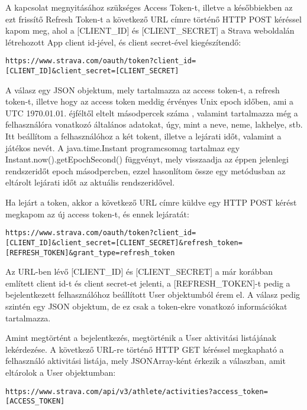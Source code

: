 A kapcsolat megnyitásához szükséges Access Token-t, illetve a későbbiekben az ezt frissítő Refresh Token-t a következő URL címre történő HTTP POST kéréssel kapom meg, ahol a [CLIENT\_ID] és [CLIENT\_SECRET] a Strava weboldalán létrehozott App client id-jével, és client secret-ével kiegészítendő:

\begin{verbatim}
https://www.strava.com/oauth/token?client_id=[CLIENT_ID]&client_secret=[CLIENT_SECRET] 
\end{verbatim}

A válasz egy JSON objektum, mely tartalmazza az access token-t, a refresh token-t, illetve hogy az access token meddig érvényes Unix epoch időben, ami a UTC 1970.01.01. éjféltől eltelt másodpercek száma , valamint tartalmazza még a felhasználóra vonatkozó általános adatokat, úgy, mint a neve, neme, lakhelye, stb. Itt beállítom a felhasználóhoz a két tokent, illetve a lejárati időt, valamint a játékos nevét. A java.time.Instant programcsomag tartalmaz egy Instant.now().getEpochSecond() függvényt, mely visszaadja az éppen jelenlegi rendszeridőt epoch másodpercben, ezzel hasonlítom össze egy metódusban az eltárolt lejárati időt az aktuális rendszeridővel. 

Ha lejárt a token, akkor a következő URL címre küldve egy HTTP POST kérést megkapom az új access token-t, és ennek lejáratát:

\begin{verbatim}
https://www.strava.com/oauth/token?client_id=[CLIENT_ID]&client_secret=[CLIENT_SECRET]&refresh_token=[REFRESH_TOKEN]&grant_type=refresh_token 
\end{verbatim}

Az URL-ben lévő [CLIENT\_ID] és [CLIENT\_SECRET] a már korábban említett client id-t és client secret-et jelenti, a [REFRESH\_TOKEN]-t pedig a bejelentkezett felhasználóhoz beállított User objektumból érem el. A válasz pedig szintén egy JSON objektum, de ez csak a token-ekre vonatkozó információkat tartalmazza. 

Amint megtörtént a bejelentkezés, megtörténik a User aktivitási listájának lekérdezése. A következő URL-re történő HTTP GET kéréssel megkapható a felhasználó aktivitási listája, mely JSONArray-ként érkezik a válaszban, amit eltárolok a User objektumban:

\begin{verbatim}
https://www.strava.com/api/v3/athlete/activities?access_token=[ACCESS_TOKEN] 
\end{verbatim}


